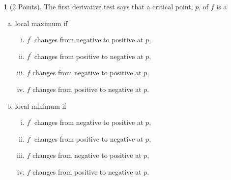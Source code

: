 \documentclass[12pt]{amsart}
\theoremstyle{definition}
\newtheorem{thm}{}
\theoremstyle{definition}
\begin{document}
\begin{thm}[2 Points]
  The first derivative test says that a critical point, $p$, of $f$ is a
  \begin{enumerate}[(a)]
  \item
    local maximum if
    \begin{multicols}{2}
      \begin{enumerate}[(i)]
      \item
        $f^\prime$ changes from negative to positive at $p$,
        \vspace{.05in}
      \item
        $f^\prime$ changes from positive to negative at $p$,
      \item
        $f$ changes from negative to positive at $p$,
        \vspace{.05in}
      \item
        $f$ changes from positive to negative at $p$.
      \end{enumerate}
    \end{multicols}
  \item
    local minimum if
    \begin{multicols}{2}
      \begin{enumerate}[(i)]
        \item
        $f^\prime$ changes from negative to positive at $p$,
        \vspace{.05in}
      \item
        $f^\prime$ changes from positive to negative at $p$,
      \item
        $f$ changes from negative to positive at $p$,
        \vspace{.05in}
      \item
        $f$ changes from positive to negative at $p$.
      \end{enumerate}
    \end{multicols}
  \end{enumerate}
\end{thm}
\end{document}
